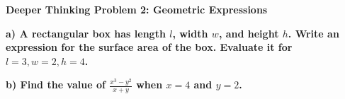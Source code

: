 \documentclass[12pt, letterpaper, fleqn]{article}
\begin{document}
\begin{tcolorbox}[colback=black!5, colframe=black!50, boxrule=1pt, arc=4mm, left=6mm, right=6mm, top=5mm, bottom=5mm]
\textbf{Deeper Thinking Problem 2: Geometric Expressions}

\medskip

\noindent
\textbf{a) A rectangular box has length $l$, width $w$, and height $h$. Write an expression for the surface area of the box. Evaluate it for $l = 3, w = 2, h = 4$.}

\vspace{2cm}

\noindent
\textbf{b) Find the value of $\frac{x^3 - y^2}{x + y}$ when $x = 4$ and $y = 2$.}

\vspace{2cm}
\end{tcolorbox}
\end{document}
